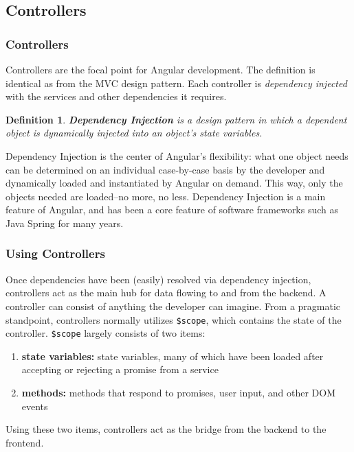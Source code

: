 \documentclass[aspectratio=169]{beamer}
\newtheorem{defn}{Definition}
\begin{document}
\subsection{Controllers}
\begin{frame}
\frametitle{Controllers}
Controllers are the focal point for Angular development. The definition is identical as from the MVC design pattern. Each controller is \emph{dependency injected} with the services and other dependencies it requires.

\begin{defn}
\textbf{Dependency Injection} is a design pattern in which a dependent object is dynamically injected into an object's state variables.
\end{defn}

Dependency Injection is the center of Angular's flexibility: what one object needs can be determined on an individual case-by-case basis by the developer and dynamically loaded and instantiated by Angular on demand. This way, only the objects needed are loaded--no more, no less. Dependency Injection is a main feature of Angular, and has been a core feature of software frameworks such as Java Spring for many years. \cite{dependency-injection, spring}
\end{frame}

\begin{frame}
\frametitle{Using Controllers}
Once dependencies have been (easily) resolved via dependency injection, controllers act as the main hub for data flowing to and from the backend. A controller can consist of anything the developer can imagine. From a pragmatic standpoint, controllers normally utilizes \texttt{\$scope}, which contains the state of the controller. \texttt{\$scope} largely consists of two items:

\begin{enumerate}
	\item \textbf{state variables:} state variables, many of which have been loaded after accepting or rejecting a promise from a service
	\item \textbf{methods:} methods that respond to promises, user input, and other DOM events
\end{enumerate}

Using these two items, controllers act as the bridge from the backend to the frontend.
\end{frame}
\end{document}
